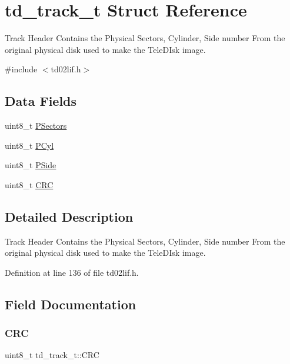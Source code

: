 \hypertarget{structtd__track__t}{}\section{td\+\_\+track\+\_\+t Struct Reference}
\label{structtd__track__t}


Track Header Contains the Physical Sectors, Cylinder, Side number From the original physical disk used to make the Tele\+D\+Isk image.  




{\ttfamily \#include $<$td02lif.\+h$>$}

\subsection*{Data Fields}
\begin{DoxyCompactItemize}
\item 
uint8\+\_\+t \hyperlink{structtd__track__t_a8f8ba7a0392f869f062f46d50a11bdfa}{P\+Sectors}
\item 
uint8\+\_\+t \hyperlink{structtd__track__t_a479a4bf60fcfdcbca513ebdea33b8e8c}{P\+Cyl}
\item 
uint8\+\_\+t \hyperlink{structtd__track__t_af2074402835d514cbf7f5f40e25fa284}{P\+Side}
\item 
uint8\+\_\+t \hyperlink{structtd__track__t_a32523d00c555ab3bc766a585d06ce372}{C\+RC}
\end{DoxyCompactItemize}


\subsection{Detailed Description}
Track Header Contains the Physical Sectors, Cylinder, Side number From the original physical disk used to make the Tele\+D\+Isk image. 

Definition at line 136 of file td02lif.\+h.



\subsection{Field Documentation}
\mbox{\label{structtd__track__t_a32523d00c555ab3bc766a585d06ce372}} 
\subsubsection{\texorpdfstring{C\+RC}{CRC}}
{\footnotesize\ttfamily uint8\+\_\+t td\+\_\+track\+\_\+t\+::\+C\+RC}



